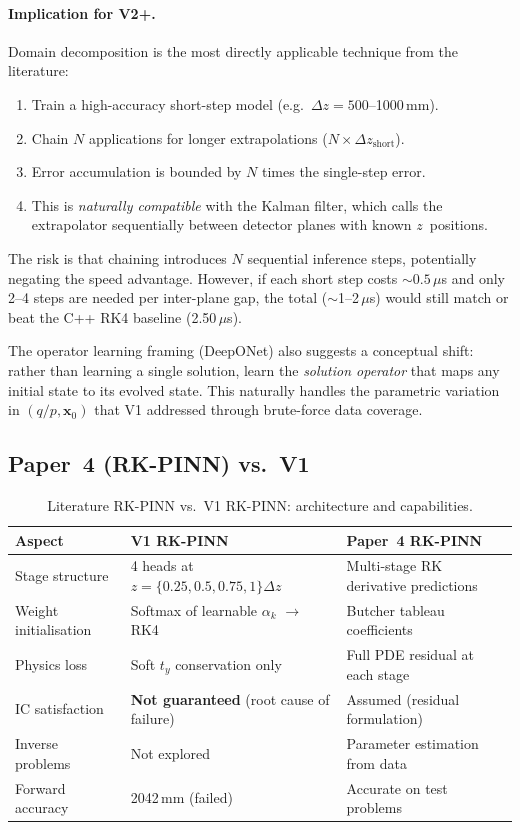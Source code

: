 \documentclass[12pt,a4paper]{article}
\newcommand{\vb}[1]{\bm{#1}}
\begin{document}
\paragraph{Implication for V2+.} Domain decomposition is the most directly applicable technique from the literature:
\begin{enumerate}
\item Train a high-accuracy short-step model (e.g.\ $\Delta z = 500$--1000\,mm).
\item Chain $N$ applications for longer extrapolations ($N \times \Delta z_{\text{short}}$).
\item Error accumulation is bounded by $N$ times the single-step error.
\item This is \emph{naturally compatible} with the Kalman filter, which calls the extrapolator sequentially between detector planes with known $z$~positions.
\end{enumerate}
The risk is that chaining introduces $N$ sequential inference steps, potentially negating the speed advantage. However, if each short step costs ${\sim}0.5\,\mu$s and only 2--4 steps are needed per inter-plane gap, the total (${\sim}$1--2\,$\mu$s) would still match or beat the C++ RK4 baseline (2.50\,$\mu$s).

The operator learning framing (DeepONet) also suggests a conceptual shift: rather than learning a single solution, learn the \emph{solution operator} that maps any initial state to its evolved state. This naturally handles the parametric variation in $(q/p, \vb{x}_0)$ that V1 addressed through brute-force data coverage.

\subsection{Paper~4 (RK-PINN) vs.\ V1}

\begin{table}[h]
\centering
\caption{Literature RK-PINN vs.\ V1 RK-PINN: architecture and capabilities.}
\label{tab:comp_rkpinn}
\begin{tabular}{p{4cm}p{5cm}p{5cm}}
\toprule
\textbf{Aspect} & \textbf{V1 RK-PINN} & \textbf{Paper~4 RK-PINN} \\
\midrule
Stage structure & 4 heads at $z = \{0.25, 0.5, 0.75, 1\}\Delta z$ & Multi-stage RK derivative predictions \\
Weight initialisation & Softmax of learnable $\alpha_k$ $\to$ RK4 & Butcher tableau coefficients \\
Physics loss & Soft $t_y$ conservation only & Full PDE residual at each stage \\
IC satisfaction & \textbf{Not guaranteed} (root cause of failure) & Assumed (residual formulation) \\
Inverse problems & Not explored & Parameter estimation from data \\
Forward accuracy & 2042\,mm (failed) & Accurate on test problems \\
\bottomrule
\end{tabular}
\end{table}
\end{document}
